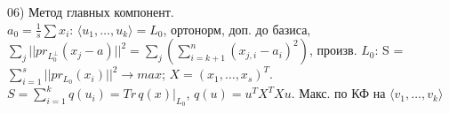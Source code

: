 06) Метод главных компонент.\\

$a_0=\frac{1}{s}\sum x_i$: $\langle u_1,\dots,u_k\rangle= L_0$, ортонорм, доп. до базиса, $\sum\limits_j||pr_{L_0^{\perp}}(x_j-a)||^2 = \sum\limits_j(\sum\limits_{i = k + 1}^n (x_{j, i} - a_i)^2)$, произв. $L_0$: S = $\sum\limits_{i = 1}^s ||pr_{L_0}(x_i)||^2 \to max$; $X=(x_1,\dots,x_s)^T$. $S = \sum\limits_{i = 1}^k q(u_i) = Tr\, q(x)|_{L_0}$, $q(u) = u^TX^TXu$. Макс. по КФ на $\langle v_1,\dots,v_k\rangle$
